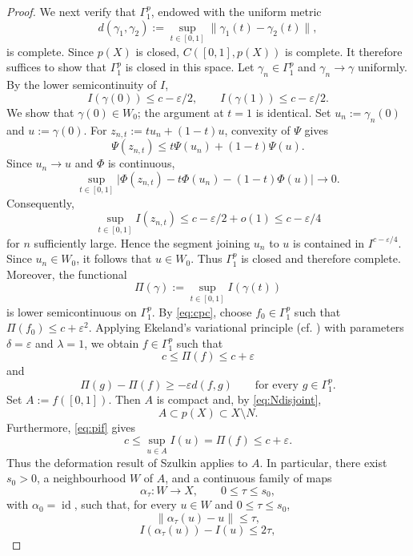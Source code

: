 \documentclass[11pt,reqno]{amsart}
\theoremstyle{plain}
\theoremstyle{definition}
\numberwithin{equation}{section}
\begin{document}
\begin{proof}
We next verify that $\Gamma_1^p$, endowed with the uniform metric
$$
d(\gamma_1,\gamma_2)
:=\sup_{t\in[0,1]}\|\gamma_1(t)-\gamma_2(t)\|,
$$
is complete. Since $p(X)$ is closed, $C([0,1],p(X))$ is complete.
It therefore suffices to show that $\Gamma_1^p$ is closed in this
space. Let $\gamma_n\in\Gamma_1^p$ and $\gamma_n\to\gamma$ uniformly.
By the lower semicontinuity of $I$,
$$
I(\gamma(0))\leq c-\varepsilon/2,
\qquad
I(\gamma(1))\leq c-\varepsilon/2.
$$
We show that $\gamma(0)\in W_0$; the argument at $t=1$ is identical.
Set $u_n:=\gamma_n(0)$ and $u:=\gamma(0)$. For
$z_{n,t}:=tu_n+(1-t)u$, convexity of $\Psi$ gives
$$
\Psi(z_{n,t})\leq t\Psi(u_n)+(1-t)\Psi(u).
$$
Since $u_n\to u$ and $\Phi$ is continuous,
$$
\sup_{t\in[0,1]}
\big|\Phi(z_{n,t})-t\Phi(u_n)-(1-t)\Phi(u)\big|\rightarrow0.
$$
Consequently,
$$
\sup_{t\in[0,1]}I(z_{n,t})
\leq c-\varepsilon/2+o(1)
\leq c-\varepsilon/4
$$
for $n$ sufficiently large. Hence the segment joining $u_n$ to $u$
is contained in $I^{c-\varepsilon/4}$. Since $u_n\in W_0$, it follows
that $u\in W_0$. Thus $\Gamma_1^p$ is closed and therefore complete.
Moreover, the functional
$$
\Pi(\gamma):=\sup_{t\in[0,1]}I(\gamma(t))
$$
is lower semicontinuous on $\Gamma_1^p$. By \eqref{eq:cpc}, choose $f_0\in\Gamma_1^p$ such that $\Pi(f_0)\leq c+\varepsilon^2$. Applying Ekeland's variational principle
(cf. \cite[Proposition 1.6]{Sz86}) with parameters $\delta=\varepsilon$ and $\lambda=1$, we obtain $f\in\Gamma_1^p$ such that
\begin{equation}\label{eq:pif}
c\leq\Pi(f)\leq c+\varepsilon
\end{equation}
and
\begin{equation}\label{eq:diffPi}
\Pi(g)-\Pi(f)
\geq-\varepsilon d(f,g)
\qquad\text{for every }g\in\Gamma_1^p.
\end{equation}
Set $A:=f([0,1])$. Then $A$ is compact and, by
\eqref{eq:Ndisjoint},
$$
A\subset p(X)\subset X\setminus N.
$$
Furthermore, \eqref{eq:pif} gives
$$
c\leq\sup_{u\in A}I(u)=\Pi(f)\leq c+\varepsilon.
$$
Thus the deformation result of Szulkin applies to $A$. In particular,
there exist $s_0>0$, a neighbourhood $W$ of $A$, and a continuous
family of maps
$$
\alpha_\tau:W\rightarrow X,
\qquad 0\leq\tau\leq s_0,
$$
with $\alpha_0=\operatorname{id}$, such that, for every
$u\in W$ and $0\leq\tau\leq s_0$,
\begin{equation}\label{eq:alpha_sminusu}
\|\alpha_\tau(u)-u\|\leq\tau,
\end{equation}
\begin{equation}\label{eq:IalphaminusIu}
I(\alpha_\tau(u))-I(u)\leq2\tau,

\end{equation}
\end{proof}
\end{document}
